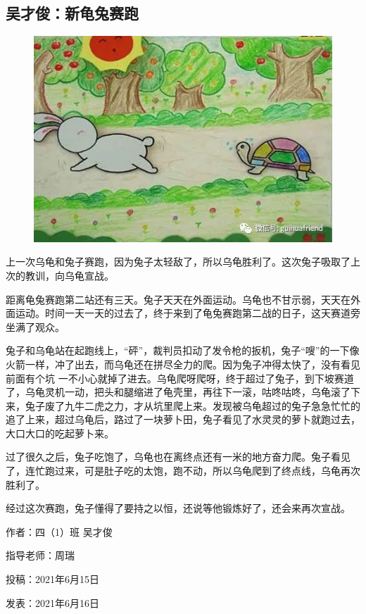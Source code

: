 \vspace{10pt}

{\centering\subsection*{吴才俊：新龟兔赛跑}}


\renewcommand{\leftmark}{吴才俊：新龟兔赛跑}

\begin{figure}[htbp]

\centering

\includegraphics[width = .5\textwidth]{./ch/3.jpg}

\end{figure}



上一次乌龟和兔子赛跑，因为兔子太轻敌了，所以乌龟胜利了。这次兔子吸取了上次的教训，向乌龟宣战。

距离龟兔赛跑第二站还有三天。兔子天天在外面运动。乌龟也不甘示弱，天天在外面运动。时间一天一天的过去了，终于来到了龟兔赛跑第二战的日子，这天赛道旁坐满了观众。

兔子和乌龟站在起跑线上，“砰”，裁判员扣动了发令枪的扳机，兔子“嗖”的一下像火箭一样，冲了出去，而乌龟还在拼尽全力的爬。因为兔子冲得太快了，没有看见前面有个坑 一不小心就掉了进去。乌龟爬呀爬呀，终于超过了兔子，到下坡赛道了，乌龟灵机一动，把头和腿缩进了龟壳里，再往下一滚，咕咚咕咚，乌龟滚了下来，兔子废了九牛二虎之力，才从坑里爬上来。发现被乌龟超过的兔子急急忙忙的追了上来，超过乌龟后，路过了一块萝卜田，兔子看见了水灵灵的萝卜就跑过去，大口大口的吃起萝卜来。

过了很久之后，兔子吃饱了，乌龟也在离终点还有一米的地方奋力爬。兔子看见了，连忙跑过来，可是肚子吃的太饱，跑不动，所以乌龟爬到了终点线，乌龟再次胜利了。

经过这次赛跑，兔子懂得了要持之以恒，还说等他锻炼好了，还会来再次宣战。





\vspace{10pt}



作者：四（1）班 吴才俊



指导老师：周瑞



投稿：2021年6月15日



发表：2021年6月16日








                



\vspace{10pt}

\hline



